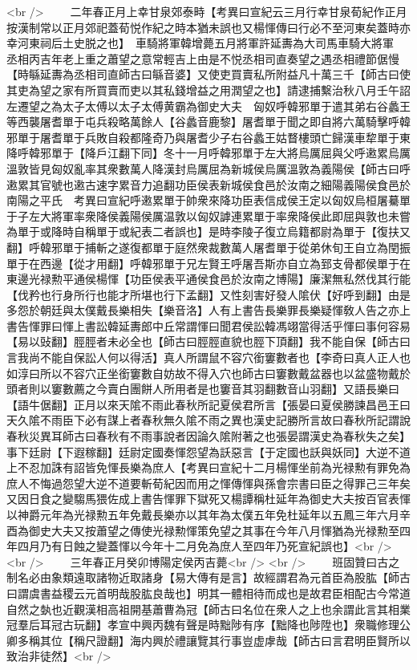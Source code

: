 <br />
　　二年春正月上幸甘泉郊泰畤【考異曰宣紀云三月行幸甘泉荀紀作正月按漢制常以正月郊祀蓋荀悦作紀之時本猶未誤也又楊惲傳曰行必不至河東矣蓋時亦幸河東祠后土史脱之也】　車騎將軍韓增薨五月將軍許延夀為大司馬車騎大將軍　丞相丙吉年老上重之蕭望之意常輕吉上由是不悦丞相司直奏望之遇丞相禮節倨慢【時緐延夀為丞相司直師古曰緐音婆】又使吏買賣私所附益凡十萬三千【師古曰使其吏為望之家有所買賣而吏以其私錢增益之用潤望之也】請逮捕繫治秋八月壬午詔左遷望之為太子太傅以太子太傅黄霸為御史大夫　匈奴呼韓邪單于遣其弟右谷蠡王等西襲屠耆單于屯兵殺略萬餘人【谷蠡音鹿黎】屠耆單于聞之即自將六萬騎擊呼韓邪單于屠耆單于兵敗自殺都隆奇乃與屠耆少子右谷蠡王姑瞀樓頭亡歸漢車犂單于東降呼韓邪單于【降戶江翻下同】冬十一月呼韓邪單于左大將烏厲屈與父呼遫累烏厲溫敦皆見匈奴亂率其衆數萬人降漢封烏厲屈為新城侯烏厲溫敦為義陽侯【師古曰呼遫累其官號也遫古速字累音力追翻功臣侯表新城侯食邑於汝南之細陽義陽侯食邑於南陽之平氏　考異曰宣紀呼遫累單于帥衆來降功臣表信成侯王定以匈奴烏桓屠驀單于子左大將軍率衆降侯義陽侯厲温敦以匈奴謼連累單于率衆降侯此即屈與敦也未嘗為單于或降時自稱單于或紀表二者誤也】是時李陵子復立烏籍都尉為單于【復扶又翻】呼韓邪單于捕斬之遂復都單于庭然衆裁數萬人屠耆單于從弟休旬王自立為閏振單于在西邊【從才用翻】呼韓邪單于兄左賢王呼屠吾斯亦自立為郅支骨都侯單于在東邊光禄勲平通侯楊惲【功臣侯表平通侯食邑於汝南之博陽】廉潔無私然伐其行能【伐矜也行身所行也能才所堪也行下孟翻】又性刻害好發人隂伏【好呼到翻】由是多怨於朝廷與太僕戴長樂相失【樂音洛】人有上書告長樂罪長樂疑惲敎人告之亦上書告惲罪曰惲上書訟韓延夀郎中丘常謂惲曰聞君侯訟韓馮翊當得活乎惲曰事何容易【易以䜴翻】脛脛者未必全也【師古曰脛脛直貌也脛下頂翻】我不能自保【師古曰言我尚不能自保訟人何以得活】真人所謂鼠不容穴銜窶數者也【李奇曰真人正人也如淳曰所以不容穴正坐銜窶數自妨故不得入穴也師古曰窶數戴盆器也以盆盛物戴於頭者則以窶數薦之今賣白團餅人所用者是也窶音其羽翻數音山羽翻】又語長樂曰【語牛倨翻】正月以來天隂不雨此春秋所記夏侯君所言【張晏曰夏侯勝諫昌邑王曰天久隂不雨臣下必有謀上者春秋無久隂不雨之異也漢史記勝所言故曰春秋所記謂說春秋災異耳師古曰春秋有不雨事說者因論久隂附著之也張晏謂漢史為春秋失之矣】事下廷尉【下遐稼翻】廷尉定國奏惲怨望為訞惡言【于定國也訞與妖同】大逆不道上不忍加誅有詔皆免惲長樂為庶人【考異曰宣紀十二月楊惲坐前為光禄勲有罪免為庶人不悔過怨望大逆不道要斬荀紀因而用之惲傳惲與孫會宗書曰臣之得罪己三年矣又因日食之變騶馬猥佐成上書告惲罪下獄死又楊譚稱杜延年為御史大夫按百官表惲以神爵元年為光禄勲五年免戴長樂亦以其年為太僕五年免杜延年以五鳳三年六月辛酉為御史大夫又按蕭望之傳使光禄勲惲策免望之其事在今年八月惲猶為光禄勲至四年四月乃有日蝕之變蓋惲以今年十二月免為庶人至四年乃死宣紀誤也】<br />
<br />
　　三年春正月癸卯博陽定侯丙吉薨<br />
<br />
　　班固贊曰古之制名必由象類遠取諸物近取諸身【易大傳有是言】故經謂君為元首臣為股肱【師古曰謂虞書益稷云元首明哉股肱良哉也】明其一體相待而成也是故君臣相配古今常道自然之埶也近觀漢相高祖開基蕭曹為冠【師古曰名位在衆人之上也余謂此言其相業冠羣后耳冠古玩翻】孝宣中興丙魏有聲是時黜陟有序【黜降也陟陞也】衆職修理公卿多稱其位【稱尺證翻】海内興於禮讓覽其行事豈虚虖哉【師古曰言君明臣賢所以致治非徒然】<br />
